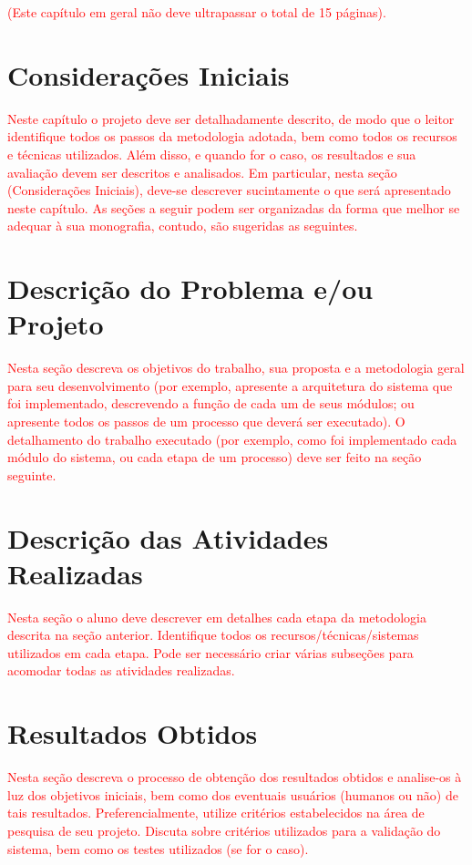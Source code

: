 \textcolor{red}{(Este capítulo em geral não deve ultrapassar o total de 15 páginas).}

\section{Considerações Iniciais}

\textcolor{red}{Neste capítulo o projeto deve ser detalhadamente descrito, de modo que o leitor identifique todos os passos da metodologia adotada, bem como todos os recursos e técnicas utilizados. Além disso, e quando for o caso, os resultados e sua avaliação devem ser descritos e analisados. Em particular, nesta seção (Considerações Iniciais), deve-se descrever sucintamente o que será apresentado neste capítulo. As seções a seguir podem ser organizadas da forma que melhor se adequar à sua monografia, contudo, são sugeridas as seguintes.}

\section{Descrição do Problema e/ou Projeto}

\textcolor{red}{Nesta seção descreva os objetivos do trabalho, sua proposta e a metodologia geral para seu desenvolvimento (por exemplo, apresente a arquitetura do sistema que foi implementado, descrevendo a função de cada um de seus módulos; ou apresente todos os passos de um processo que deverá ser executado). O detalhamento do trabalho executado (por exemplo, como foi implementado cada módulo do sistema, ou cada etapa de um processo) deve ser feito na seção seguinte.}

\section{Descrição das Atividades Realizadas}

\textcolor{red}{Nesta seção o aluno deve descrever em detalhes cada etapa da metodologia descrita na seção anterior. Identifique todos os recursos/técnicas/sistemas utilizados em cada etapa. Pode ser necessário criar várias subseções para acomodar todas as atividades realizadas.}

\section{Resultados Obtidos}

\textcolor{red}{Nesta seção descreva o processo de obtenção dos resultados obtidos e analise-os à luz dos objetivos iniciais, bem como dos eventuais usuários (humanos ou não) de tais resultados. Preferencialmente, utilize critérios estabelecidos na área de pesquisa de seu projeto. Discuta sobre critérios utilizados para a validação do sistema, bem como os testes utilizados (se for o caso).}

